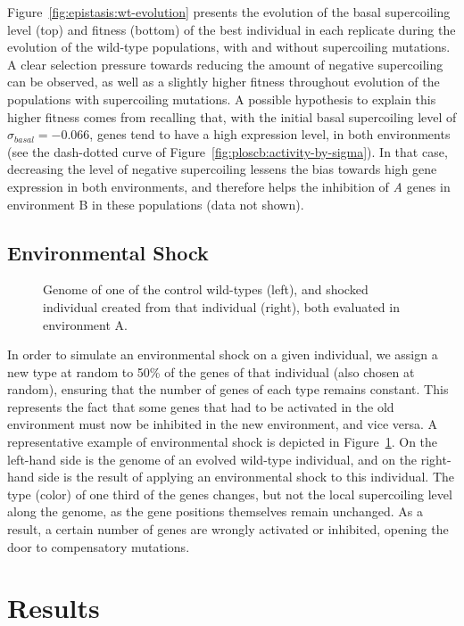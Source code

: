 Figure~\ref{fig:epistasis:wt-evolution} presents the evolution of the basal supercoiling level (top) and fitness (bottom) of the best individual in each replicate during the evolution of the wild-type populations, with and without supercoiling mutations.
A clear selection pressure towards reducing the amount of negative supercoiling can be observed, as well as a slightly higher fitness throughout evolution of the populations with supercoiling mutations.
A possible hypothesis to explain this higher fitness comes from recalling that, with the initial basal supercoiling level of $\sigma_{basal} = -0.066$, genes tend to have a high expression level, in both environments (see the dash-dotted curve of Figure~\ref{fig:ploscb:activity-by-sigma}).
In that case, decreasing the level of negative supercoiling lessens the bias towards high gene expression in both environments, and therefore helps the inhibition of \emph{A} genes in environment B in these populations (data not shown).

\subsection{Environmental Shock}

\begin{figure}
  \centering
  \begin{elasticrow}[width=\textwidth]
  \end{elasticrow}
  \caption[Evolved wild-type individual before and after an environmental shock]{Genome of one of the control wild-types (left), and shocked individual created from that individual (right), both evaluated in environment A.}
  \label{fig:epistasis:shock}
\end{figure}

In order to simulate an environmental shock on a given individual, we assign a new type at random to 50\% of the genes of that individual (also chosen at random), ensuring that the number of genes of each type remains constant.
This represents the fact that some genes that had to be activated in the old environment must now be inhibited in the new environment, and vice versa.
A representative example of environmental shock is depicted in Figure~\ref{fig:epistasis:shock}.
On the left-hand side is the genome of an evolved wild-type individual, and on the right-hand side is the result of applying an environmental shock to this individual.
The type (color) of one third of the genes changes, but not the local supercoiling level along the genome, as the gene positions themselves remain unchanged.
As a result, a certain number of genes are wrongly activated or inhibited, opening the door to compensatory mutations.

\section{Results}

